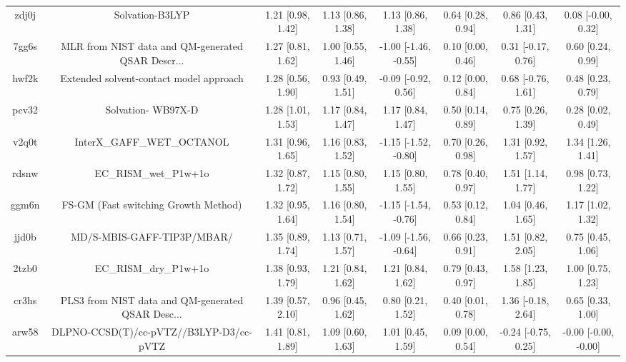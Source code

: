 \documentclass{article}
\begin{document}
\begin{center}
\begin{longtable}{|cccccccc|}
 zdj0j &                                    Solvation-B3LYP &  1.21 [0.98, 1.42] &  1.13 [0.86, 1.38] &     1.13 [0.86, 1.38] &  0.64 [0.28, 0.94] &    0.86 [0.43, 1.31] &    0.08 [-0.00, 0.32] \\
 7gg6s &  MLR from NIST data and QM-generated QSAR Descr... &  1.27 [0.81, 1.62] &  1.00 [0.55, 1.46] &  -1.00 [-1.46, -0.55] &  0.10 [0.00, 0.46] &   0.31 [-0.17, 0.76] &     0.60 [0.24, 0.99] \\
 hwf2k &            Extended solvent-contact model approach &  1.28 [0.56, 1.90] &  0.93 [0.49, 1.51] &   -0.09 [-0.92, 0.56] &  0.12 [0.00, 0.84] &   0.68 [-0.76, 1.61] &     0.48 [0.23, 0.79] \\
 pcv32 &                                 Solvation- WB97X-D &  1.28 [1.01, 1.53] &  1.17 [0.84, 1.47] &     1.17 [0.84, 1.47] &  0.50 [0.14, 0.89] &    0.75 [0.26, 1.39] &     0.28 [0.02, 0.49] \\
 v2q0t &                         InterX\_GAFF\_WET\_OCTANOL &  1.31 [0.96, 1.65] &  1.16 [0.83, 1.52] &  -1.15 [-1.52, -0.80] &  0.70 [0.26, 0.98] &    1.31 [0.92, 1.57] &     1.34 [1.26, 1.41] \\
 rdsnw &                              EC\_RISM\_wet\_P1w+1o &  1.32 [0.87, 1.72] &  1.15 [0.80, 1.55] &     1.15 [0.80, 1.55] &  0.78 [0.40, 0.97] &    1.51 [1.14, 1.77] &     0.98 [0.73, 1.22] \\
 ggm6n &               FS-GM (Fast switching Growth Method) &  1.32 [0.95, 1.64] &  1.16 [0.80, 1.54] &  -1.15 [-1.54, -0.76] &  0.53 [0.12, 0.84] &    1.04 [0.46, 1.65] &     1.17 [1.02, 1.32] \\
 jjd0b &                         MD/S-MBIS-GAFF-TIP3P/MBAR/ &  1.35 [0.89, 1.74] &  1.13 [0.71, 1.57] &  -1.09 [-1.56, -0.64] &  0.66 [0.23, 0.91] &    1.51 [0.82, 2.05] &     0.75 [0.45, 1.06] \\
 2tzb0 &                              EC\_RISM\_dry\_P1w+1o &  1.38 [0.93, 1.79] &  1.21 [0.84, 1.62] &     1.21 [0.84, 1.62] &  0.79 [0.43, 0.97] &    1.58 [1.23, 1.85] &     1.00 [0.75, 1.23] \\
 cr3hs &  PLS3 from NIST data and QM-generated QSAR Desc... &  1.39 [0.57, 2.10] &  0.96 [0.45, 1.62] &     0.80 [0.21, 1.52] &  0.40 [0.01, 0.78] &   1.36 [-0.18, 2.64] &     0.65 [0.33, 1.00] \\
 arw58 &            DLPNO-CCSD(T)/cc-pVTZ//B3LYP-D3/cc-pVTZ &  1.41 [0.81, 1.89] &  1.09 [0.60, 1.63] &     1.01 [0.45, 1.59] &  0.09 [0.00, 0.54] &  -0.24 [-0.75, 0.25] &  -0.00 [-0.00, -0.00] \\

\end{longtable}
\end{center}
\end{document}
